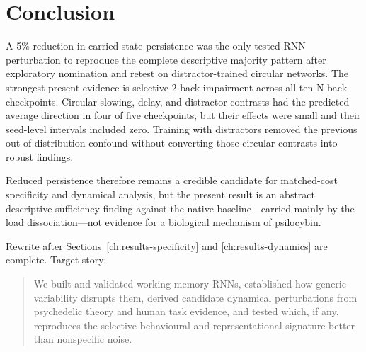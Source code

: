 \section{Conclusion}
\label{ch:conclusion}

A 5\% reduction in carried-state persistence was the only tested RNN
perturbation to reproduce the complete descriptive majority pattern after
exploratory nomination and retest on distractor-trained circular networks.
The strongest present evidence is selective 2-back impairment across all ten
N-back checkpoints. Circular slowing, delay, and distractor contrasts had the
predicted average direction in four of five checkpoints, but their effects were
small and their seed-level intervals included zero. Training with distractors
removed the previous out-of-distribution confound without converting those
circular contrasts into robust findings.

Reduced persistence therefore remains a credible candidate for matched-cost
specificity and dynamical analysis, but the present result is an abstract
descriptive sufficiency finding against the native baseline---carried mainly by
the load dissociation---not evidence for a biological mechanism of psilocybin.

\begin{scaffold}
Rewrite after Sections~\ref{ch:results-specificity} and
\ref{ch:results-dynamics} are complete. Target story:
\begin{quote}
We built and validated working-memory RNNs, established how generic variability
disrupts them, derived candidate dynamical perturbations from psychedelic
theory and human task evidence, and tested which, if any, reproduces the
selective behavioural and representational signature better than nonspecific
noise.
\end{quote}
\end{scaffold}
